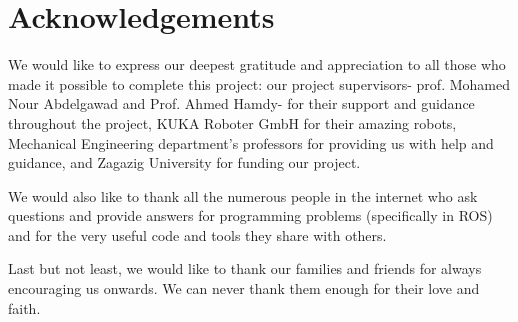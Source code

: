 
\chapter*{Acknowledgements}
%
%
%
%
%
%
%
%
%
%
%
We would like to express our deepest gratitude and appreciation to all those who made it possible to complete this project: our project supervisors- prof. Mohamed Nour Abdelgawad and Prof. Ahmed Hamdy- for their support and guidance throughout the project,  KUKA Roboter GmbH for their amazing robots, Mechanical Engineering department's professors for providing us with help and guidance, and Zagazig University for funding our project.

We would also like to thank all the numerous people in the internet who ask questions and provide answers for programming problems (specifically in ROS) and for the very useful code and tools they share with others.

Last but not least, we would like to thank our families and friends for always encouraging us onwards. We can never thank them enough for their love and faith.